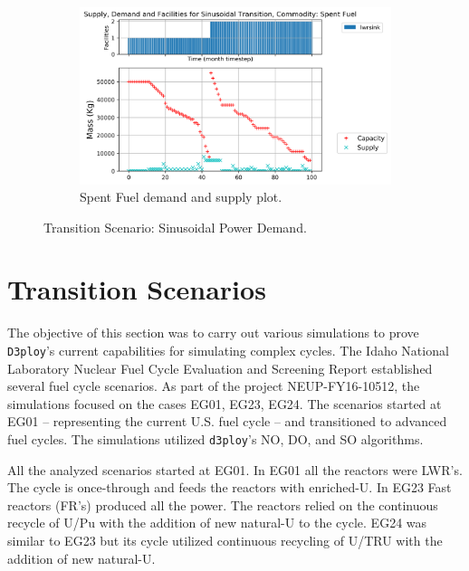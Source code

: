 \documentclass[11pt,letterpaper]{article}
\begin{document}
\begin{figure}[!htbp]
\begin{subfigure}[t]{0.45\textwidth}
    \end{subfigure}
    \hfill
    \begin{subfigure}[t]{0.45\textwidth}
        \centering
        \includegraphics[width=\linewidth]{figures/sinetransition-spentfuel.png} 
        \caption{Spent Fuel demand and supply plot.}
        \label{fig:sinetransition-spentfuel}
    \end{subfigure}
    \caption{Transition Scenario: Sinusoidal Power Demand.}
\end{figure}

\pagebreak
\section{Transition Scenarios}

The objective of this section was to carry out various simulations to prove 
\texttt{D3ploy}'s current capabilities for simulating complex cycles.
The Idaho National Laboratory Nuclear Fuel Cycle Evaluation and Screening Report \cite{wigeland_nuclear_2014} established several fuel cycle scenarios.
As part of the project NEUP-FY16-10512, the simulations focused on the cases EG01, EG23, EG24. The scenarios started at EG01 -- representing the current U.S. fuel cycle -- and transitioned to advanced fuel cycles.
The simulations utilized \texttt{d3ploy}'s NO, DO, and SO algorithms.

All the analyzed scenarios started at EG01. In EG01 all the reactors were LWR's. The cycle is once-through and feeds the reactors with enriched-U.
In EG23 Fast reactors (FR's) produced all the power. The reactors relied on the continuous recycle of U/Pu with the addition of new natural-U to the cycle.
EG24 was similar to EG23 but its cycle utilized continuous recycling of U/TRU with the addition of new natural-U.
\end{document}
